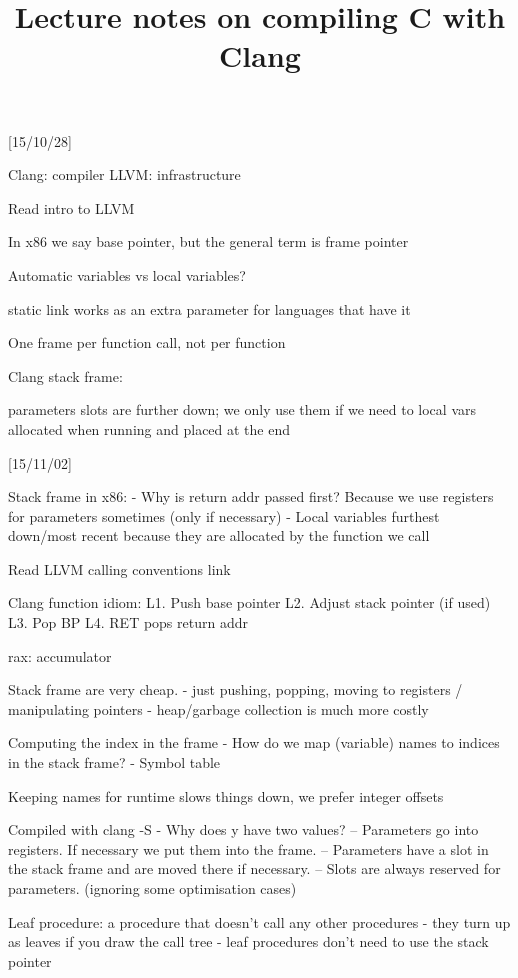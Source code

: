 \documentclass{article}
\title{Lecture notes on compiling C with Clang}
\begin{document}
\maketitle

[15/10/28]

Clang: compiler
LLVM: infrastructure

Read intro to LLVM

In x86 we say base pointer, but the general term is frame pointer

Automatic variables vs local variables?

static link works as an extra parameter for languages that have it

One frame per function call, not per function

Clang stack frame:

parameters slots are further down; we only use them if we need to
local vars allocated when running and placed at the end

[15/11/02]

Stack frame in x86:
- Why is return addr passed first? Because we use registers for parameters sometimes (only if necessary)
- Local variables furthest down/most recent because they are allocated by the function we call

Read LLVM calling conventions link

Clang function idiom:
L1. Push base pointer
L2. Adjust stack pointer (if used)
L3. Pop BP
L4. RET pops return addr

rax: accumulator

Stack frame are very cheap.
- just pushing, popping, moving to registers / manipulating pointers
- heap/garbage collection is much more costly

Computing the index in the frame
- How do we map (variable) names to indices in the stack frame?
- Symbol table

Keeping names for runtime slows things down, we prefer integer offsets

Compiled with clang -S
- Why does y have two values?
-- Parameters go into registers. If necessary we put them into the frame.
-- Parameters have a slot in the stack frame and are moved there if necessary.
-- Slots are always reserved for parameters. (ignoring some optimisation cases)

Leaf procedure: a procedure that doesn't call any other procedures
- they turn up as leaves if you draw the call tree
- leaf procedures don't need to use the stack pointer
\end{document}
